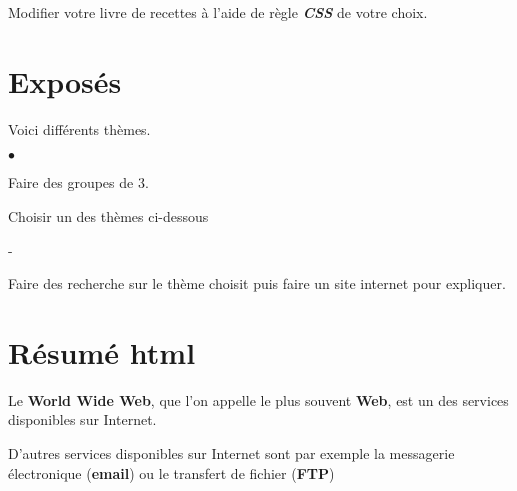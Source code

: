 \documentclass[10pt,dvipsnames, dvips, svgnames]{article}
\begin{document}
Modifier votre livre de recettes à l'aide de règle \textbf{\textit{CSS}} de votre choix.

\section{Exposés}

Voici différents thèmes. 

\begin{list}{$\bullet$}{}
\item Faire des groupes de 3.
\item Choisir un des thèmes ci-dessous
	\begin{list}{-}{}
	\item 
	\end{list}
\item Faire des recherche sur le thème choisit puis faire un site internet pour expliquer.
\end{list}




\newpage

\section{Résumé  html}

Le \textbf{World Wide Web}, que l'on appelle le plus souvent \textbf{Web}, est un des services disponibles sur Internet.

D'autres services disponibles sur Internet sont par exemple la messagerie électronique (\textbf{email}) ou le transfert de fichier (\textbf{FTP})
\end{document}
